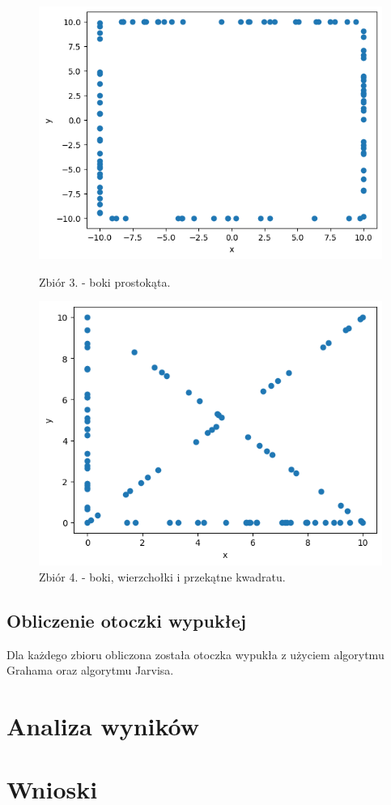 \documentclass[11pt]{scrartcl}
\begin{document}
    \begin{figure}[H]
        \centering
        \begin{minipage}{0.45\linewidth}
          \centering
          \includegraphics[width=1\linewidth]{2_3.png}
          \caption{Zbiór 3. - boki prostokąta.}
        \end{minipage}
        \begin{minipage}{0.45\linewidth}
          \centering
          \includegraphics[width=1\linewidth]{2_4.png}
          \caption{Zbiór 4. - boki, wierzchołki i przekątne kwadratu.}
        \end{minipage}
    \end{figure}

    \subsection{Obliczenie otoczki wypukłej}
    Dla każdego zbioru obliczona została otoczka wypukła z użyciem algorytmu
    Grahama oraz algorytmu Jarvisa.

    \section{Analiza wyników}
    \section{Wnioski}
\end{document}
